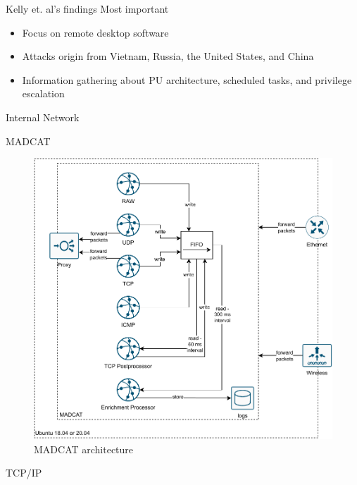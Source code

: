 \begin{frame}{Kelly et. al's findings}
    Most important
    \begin{itemize}
        \item Focus on remote desktop software
        \item Attacks origin from Vietnam, Russia, the United States, and China
        \item Information gathering about PU architecture, scheduled tasks, and privilege escalation
    \end{itemize}
\end{frame}

\begin{frame}{Internal Network}

\end{frame}

\begin{frame}{MADCAT}
    \begin{figure}
        \centering
        \includegraphics[width=0.7\columnwidth]{img/heicat_architecture.pdf}
        \caption[MADCAT architecture]{
            MADCAT architecture
        }
    \end{figure}
\end{frame}

\begin{frame}{TCP/IP}

\end{frame}

